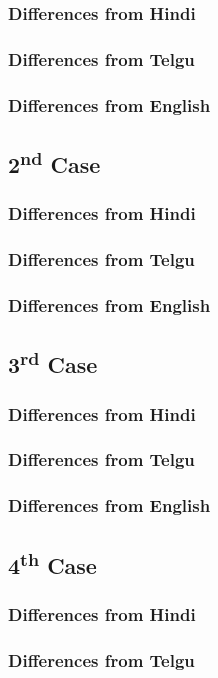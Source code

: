 \documentclass[a4paper,10pt]{article}
\begin{document}
\subsubsection{Differences from Hindi}
\subsubsection{Differences from Telgu}
\subsubsection{Differences from English}
\subsection{2\textsuperscript{nd} Case}
\subsubsection{Differences from Hindi}
\subsubsection{Differences from Telgu}
\subsubsection{Differences from English}
\subsection{3\textsuperscript{rd} Case}
\subsubsection{Differences from Hindi}
\subsubsection{Differences from Telgu}
\subsubsection{Differences from English}
\subsection{4\textsuperscript{th} Case}
\subsubsection{Differences from Hindi}
\subsubsection{Differences from Telgu}
\end{document}
